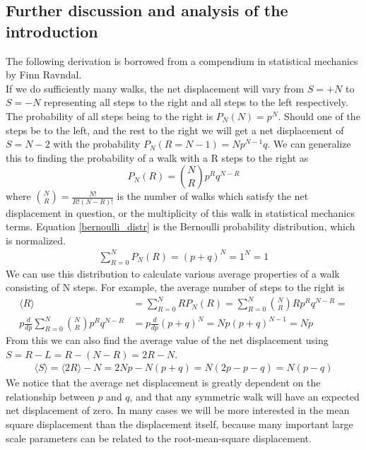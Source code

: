 \subsection{Further discussion and analysis of the introduction}\label{further_introduction}
The following derivation is borrowed from a compendium in statistical mechanics by Finn Ravndal. \\
If we do sufficiently many walks, the net displacement will vary from $S=+N$ to $S=-N$ representing all steps to the right and all steps to the left respectively. 
The probability of all steps being to the right is $P_N(N) = p^N$. 
Should one of the steps be to the left, and the rest to the right we will get a net displacement of $S = N-2$ with the probability $P_N(R = N-1) = Np^{N-1}q$. 
We can generalize this to finding the probability of a walk with a R steps to the right as 
\begin{equation}\label{bernoulli_distr}
 P_N(R) = {N\choose R}p^{R}q^{N-R}
\end{equation}
where ${N\choose R}=\frac{N!}{R!(N-R)!}$ is the number of walks which satisfy the net displacement in question, or the multiplicity of this walk in statistical mechanics terms. 
Equation \ref{bernoulli_distr} is the Bernoulli probability distribution, which is normalized.
\begin{align*}
 \sum\limits_{R=0}^N P_N(R) = (p+q)^N = 1^N = 1
\end{align*}
We can use this distribution to calculate various average properties of a walk consisting of N steps. 
For example, the average number of steps to the right is
\begin{align*}
 \langle R\rangle &=  \sum\limits_{R=0}^N RP_N(R) =  \sum\limits_{R=0}^N {N\choose R}Rp^Rq^{N-R} = \\
 p\frac{d}{dp} \sum\limits_{R=0}^N {N\choose R}p^Rq^{N-R} &= p\frac{d}{dp}(p+q)^N = Np(p+q)^{N-1} = Np
\end{align*}
From this we can also find the average value of the net displacement using $S = R-L = R-(N-R) = 2R-N$.
\begin{align*}
 \langle S\rangle = \langle2R\rangle -N = 2Np-N(p+q) = N(2p-p-q) = N(p-q)
\end{align*}
We notice that the average net displacement is greatly dependent on the relationship between $p$ and $q$, and that any symmetric walk will have an expected net displacement of zero. 
In many cases we will be more interested in the mean square displacement than the displacement itself, because many important large scale parameters can be related to the root-mean-square displacement. 
